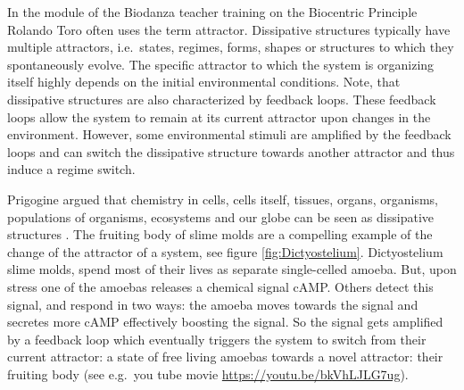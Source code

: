 \documentclass[
  11pt,
]{book}
\begin{document}
In the module of the Biodanza teacher training on the Biocentric Principle Rolando Toro often uses the term attractor. Dissipative structures typically have multiple attractors, i.e.~states, regimes, forms, shapes or structures to which they spontaneously evolve. The specific attractor to which the system is organizing itself highly depends on the initial environmental conditions.
Note, that dissipative structures are also characterized by feedback loops.
These feedback loops allow the system to remain at its current attractor upon changes in the environment.
However, some environmental stimuli are amplified by the feedback loops and can switch the dissipative structure towards another attractor and thus induce a regime switch.

Prigogine argued that chemistry in cells, cells itself, tissues, organs, organisms, populations of organisms, ecosystems and our globe can be seen as dissipative structures \citep{prigogineStengers1984}.
The fruiting body of slime molds are a compelling example of the change of the attractor of a system, see figure \ref{fig:Dictyostelium}. Dictyostelium slime molds, spend most of their lives as separate single-celled amoeba. But, upon stress one of the amoebas releases a chemical signal cAMP. Others detect this signal, and respond in two ways: the amoeba moves towards the signal and secretes more cAMP effectively boosting the signal. So the signal gets amplified by a feedback loop which eventually triggers the system to switch from their current attractor: a state of free living amoebas towards a novel attractor: their fruiting body (see e.g.~you tube movie \url{https://youtu.be/bkVhLJLG7ug}).
\end{document}
